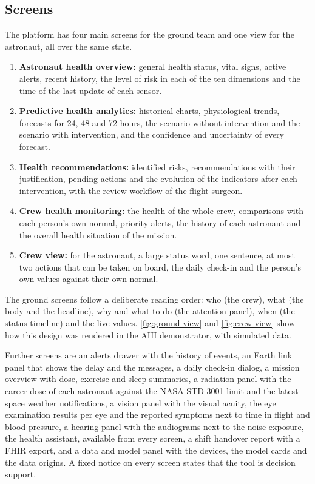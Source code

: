 \subsection{Screens}
\label{subsec:screens}

The platform has four main screens for the ground team and one view for the astronaut, all over the same state.

\begin{enumerate}
\item \textbf{Astronaut health overview:} general health status, vital signs, active alerts, recent history, the level of risk in each of the ten dimensions and the time of the last update of each sensor.
\item \textbf{Predictive health analytics:} historical charts, physiological trends, forecasts for 24, 48 and 72 hours, the scenario without intervention and the scenario with intervention, and the confidence and uncertainty of every forecast.
\item \textbf{Health recommendations:} identified risks, recommendations with their justification, pending actions and the evolution of the indicators after each intervention, with the review workflow of the flight surgeon.
\item \textbf{Crew health monitoring:} the health of the whole crew, comparisons with each person's own normal, priority alerts, the history of each astronaut and the overall health situation of the mission.
\item \textbf{Crew view:} for the astronaut, a large status word, one sentence, at most two actions that can be taken on board, the daily check-in and the person's own values against their own normal.
\end{enumerate}

The ground screens follow a deliberate reading order: who (the crew), what (the body and the headline), why and what to do (the attention panel), when (the status timeline) and the live values. \ref{fig:ground-view} and \ref{fig:crew-view} show how this design was rendered in the AHI demonstrator, with simulated data.

Further screens are an alerts drawer with the history of events, an Earth link panel that shows the delay and the messages, a daily check-in dialog, a mission overview with dose, exercise and sleep summaries, a radiation panel with the career dose of each astronaut against the NASA-STD-3001 limit and the latest space weather notifications, a vision panel with the visual acuity, the eye examination results per eye and the reported symptoms next to time in flight and blood pressure, a hearing panel with the audiograms next to the noise exposure, the health assistant, available from every screen, a shift handover report with a FHIR export, and a data and model panel with the devices, the model cards and the data origins. A fixed notice on every screen states that the tool is decision support.

